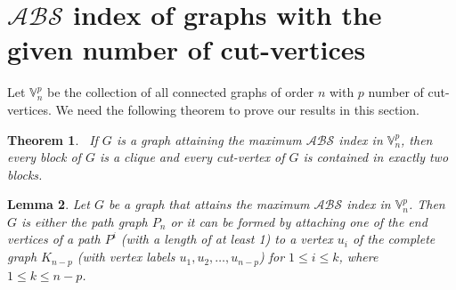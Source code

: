 \documentclass[12pt]{article}
\newtheorem{theorem}{Theorem}[section]
\newtheorem{lemma}[theorem]{Lemma}
\begin{document}
      \section{$\mathcal{ABS}$ index of graphs with the given number of cut-vertices}\label{given1}
Let $\mathbb{V}_{n}^p$ be the collection of all  connected graphs of order $n$ with $p$ number of cut-vertices. We need the following theorem to prove our results in this section.
\begin{theorem}~\rm\cite{wu2017monotonicity,ali2024extremal}\label{clique theorem}
If $G$ is a graph attaining the maximum $\mathcal{ABS}$ index in $\mathbb{V}_{n}^p$, then every block of $G$ is a clique and every cut-vertex of $G$ is contained in exactly two blocks.
\end{theorem}
\begin{lemma}\label{lemma clique}
Let $G$ be a graph that attains the maximum $\mathcal{ABS}$ index in $\mathbb{V}_{n}^p$. Then $G$ is either the path graph $P_{n}$ or it can be formed by attaching one of the end vertices of a path $P^{i}$ (with a length of at least 1) to a vertex $u_i$ of the complete graph $K_{n-p}$ (with vertex labels $u_1,u_2,\ldots,u_{n-p}$) for $1\le i \le k$, where $1\le k\le n-p$.
\end{lemma}
\end{document}
